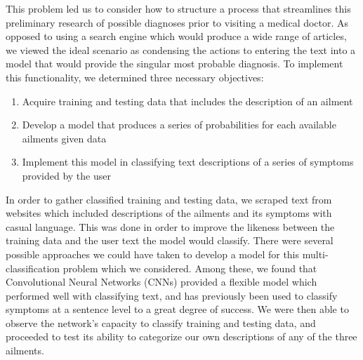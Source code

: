 \documentclass[12pt]{report}
\begin{document}
This problem led us to consider how to structure a process that streamlines
this preliminary research of possible diagnoses prior to visiting a medical
doctor. As opposed to using a search engine which would produce a wide range of
articles, we viewed the ideal scenario as condensing the actions to entering
the text into a model that would provide the singular most probable diagnosis.
To implement this functionality, we determined three necessary objectives:
\begin{enumerate}
  \item Acquire training and testing data that includes the description of an ailment
  \item Develop a model that produces a series of probabilities for each available ailments given data
  \item Implement this model in classifying text descriptions of a series of symptoms provided by the user
\end{enumerate}

In order to gather classified training and testing data, we scraped text from
websites which included descriptions of the ailments and its symptoms with
casual language. This was done in order to improve the likeness between the
training data and the user text the model would classify. There were several
possible approaches we could have taken to develop a model for this
multi-classification problem which we considered. Among these, we found that
Convolutional Neural Networks (CNNs) provided a flexible model which performed
well with classifying text, and has previously been used to classify symptoms
at a sentence level to a great degree of success. We were then able to observe
the network's capacity to classify training and testing data, and proceeded to
test its ability to categorize our own descriptions of any of the three
ailments.
\end{document}
